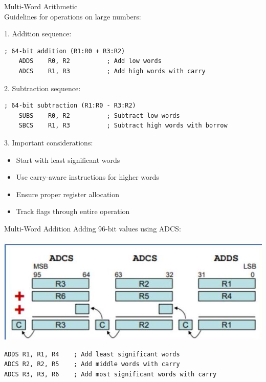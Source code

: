 \begin{KR}{Multi-Word Arithmetic}\\
Guidelines for operations on large numbers:

1. Addition sequence:
\begin{lstlisting}[language=armasm, style=basesmol]
    ; 64-bit addition (R1:R0 + R3:R2)
    ADDS    R0, R2          ; Add low words
    ADCS    R1, R3          ; Add high words with carry
\end{lstlisting}

2. Subtraction sequence:
\begin{lstlisting}[language=armasm, style=basesmol]
    ; 64-bit subtraction (R1:R0 - R3:R2)
    SUBS    R0, R2          ; Subtract low words
    SBCS    R1, R3          ; Subtract high words with borrow
\end{lstlisting}

3. Important considerations:
\begin{itemize}
  \item Start with least significant words
  \item Use carry-aware instructions for higher words
  \item Ensure proper register allocation
  \item Track flags through entire operation
\end{itemize}
\end{KR}

\begin{example2}{Multi-Word Addition}
Adding 96-bit values using ADCS:

\includegraphics[width=\linewidth]{images/2024_12_29_79e6b22f503fb7b4f718g-04}

\begin{lstlisting}[language=armasm, style=basesmol]
ADDS R1, R1, R4    ; Add least significant words
ADCS R2, R2, R5    ; Add middle words with carry
ADCS R3, R3, R6    ; Add most significant words with carry
\end{lstlisting}
\end{example2}

